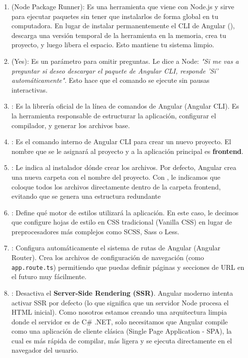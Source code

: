 \documentclass[
10pt, %
a4paper, %
oneside, %
headinclude,footinclude, %
BCOR5mm, %
]{scrartcl}
\begin{document}
\begin{enumerate}
	\item {} (Node Package Runner): Es una herramienta que viene con Node.js y sirve para ejecutar paquetes sin tener que instalarlos de forma global en tu computadora. En lugar de instalar permanentemente el CLI de Angular (),  descarga una versión temporal de la herramienta en la memoria, crea tu proyecto, y luego libera el espacio. Esto mantiene tu sistema limpio.
	\item {} (Yes): Es un parámetro para omitir preguntas. Le dice a Node: \textit{"Si me vas a preguntar si deseo descargar el paquete de Angular CLI, responde 'Sí' automáticamente"}. Esto hace que el comando se ejecute sin pausas interactivas.
	\item {}: Es la librería oficial de la línea de comandos de Angular (Angular CLI). Es la herramienta responsable de estructurar la aplicación, configurar el compilador, y generar los archivos base.
	\item {}: Es el comando interno de Angular CLI para crear un nuevo proyecto. El nombre que se le asignará al proyecto y a la aplicación principal es \textbf{frontend}.
	\item {}: Le indica al instalador dónde crear los archivos. Por defecto, Angular crea una nueva carpeta con el nombre del proyecto. Con , le indicamos que coloque todos los archivos directamente dentro de la carpeta frontend, evitando que se genera una estructura redundante 
	\item {}: Define qué motor de estilos utilizará la aplicación. En este caso, le decimos que configure hojas de estilo en CSS tradicional (Vanilla CSS) en lugar de preprocesadores más complejos como SCSS, Sass o Less.
	\item {}: Configura automáticamente el sistema de rutas de Angular (Angular Router). Crea los archivos de configuración de navegación (como \texttt{app.route.ts}) permitiendo que puedas definir páginas y secciones de URL en el futuro muy fácilmente.
	\item {}: Desactiva el \textbf{Server-Side Rendering (SSR)}. Angular moderno intenta activar SSR por defecto (lo que significa que un servidor Node procesa el HTML inicial). Como nosotros estamos creando una arquitectura limpia donde el servidor es de C\# .NET, solo necesitamos que Angular compile como una aplicación de cliente clásica (Single Page Application - SPA), la cual es más rápida de compilar, más ligera y se ejecuta directamente en el navegador del usuario.
\end{enumerate}
\end{document}
